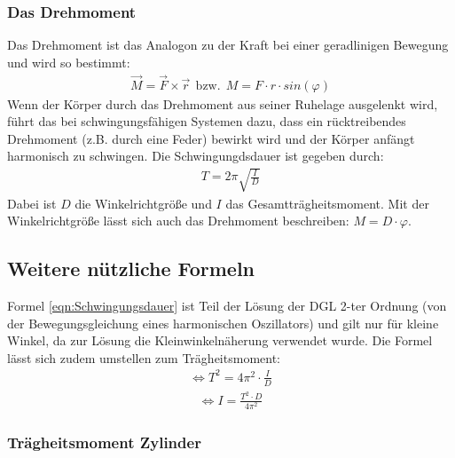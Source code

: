 \subsubsection{Das Drehmoment}

Das Drehmoment ist das Analogon zu der Kraft bei einer geradlinigen Bewegung und wird so bestimmt:
\begin{align}
    \label{eqn:Drehmoment}
    \vec{M} = \vec{F} \times \vec{r} \:\: \mathrm{bzw.} \:\: M = F \cdot r \cdot sin(\varphi)
\end{align}
Wenn der Körper durch das Drehmoment aus seiner Ruhelage ausgelenkt wird, führt das bei schwingungsfähigen Systemen dazu,
dass ein rücktreibendes Drehmoment (z.B. durch eine Feder) bewirkt wird und der Körper anfängt harmonisch zu schwingen. Die Schwingungdsdauer
ist gegeben durch:
\begin{align}
    \label{eqn:Schwingungsdauer}
    T = 2\pi \sqrt{\frac{I}{D}}
\end{align}
Dabei ist $D$ die Winkelrichtgröße und $I$ das Gesamtträgheitsmoment. Mit der Winkelrichtgröße lässt sich auch das Drehmoment beschreiben: $M = D \cdot \varphi$.
\\

\subsection{Weitere nützliche Formeln}

Formel \ref{eqn:Schwingungsdauer} ist Teil der Lösung der DGL 2-ter Ordnung (von der Bewegungsgleichung eines harmonischen Oszillators) und gilt nur für kleine
 Winkel, da zur Lösung die Kleinwinkelnäherung verwendet wurde.
Die Formel lässt sich zudem umstellen zum Trägheitsmoment:
\begin{align*}
    \Leftrightarrow T^2 = 4\pi^2 \cdot \frac{I}{D} 
\end{align*}
\begin{align}
    \label{eqn:I(T)}
    \Leftrightarrow I = \frac{T^2 \cdot D}{4\pi^2}
\end{align}

\subsubsection{Trägheitsmoment Zylinder}

